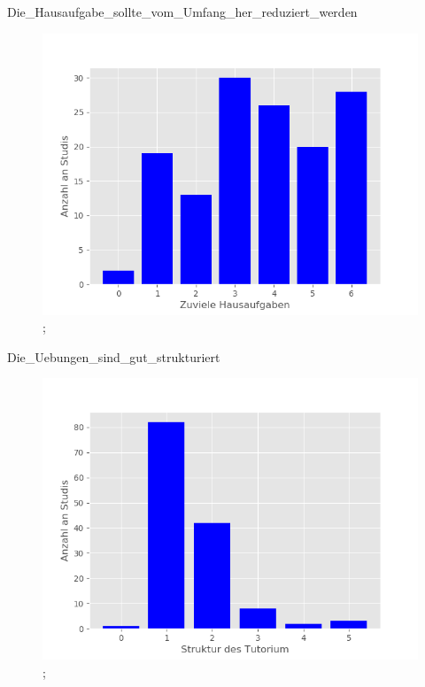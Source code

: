 \documentclass[10pt]{beamer}
\begin{document}
\begin{frame}[fragile]{Die_Hausaufgabe_sollte_vom_Umfang_her_reduziert_werden} 
 \begin{figure}
 \includegraphics[width= 0.9\linewidth]{./PDFcreater/Plots/Die_Hausaufgabe_sollte_vom_Umfang_her_reduziert_werden.png};
 \end{figure}
 \end{frame}
\begin{frame}[fragile]{Die_Uebungen_sind_gut_strukturiert} 
 \begin{figure}
 \includegraphics[width= 0.9\linewidth]{./PDFcreater/Plots/Die_Uebungen_sind_gut_strukturiert.png};
 \end{figure}
 \end{frame}
\end{document}
